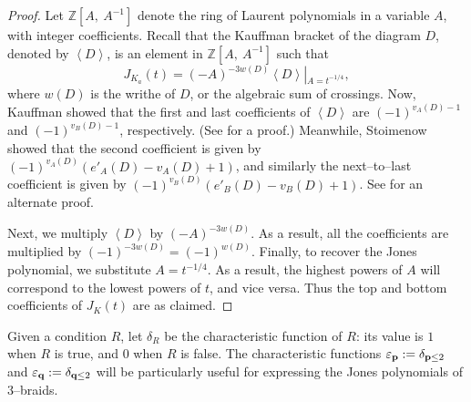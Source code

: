 \documentclass[11pt]{amsart}
\newcommand{\ZZ}{{\mathbb{Z}}}
\newcommand{\p}{{\bf p}}
\newcommand{\q}{{\bf q}}
\newcommand{\ep}{\varepsilon_{\p}}
\newcommand{\eq}{\varepsilon_{\q}}
\theoremstyle{plain}
\theoremstyle{definition}
\begin{document}
\begin{proof}
Let $\ZZ [A,\ A^{-1}]$ denote the ring of Laurent polynomials in a
variable $A$, with integer coefficients.  Recall that the Kauffman
bracket of the diagram $D$, denoted by $\left < D\right >$, is an
element in $\ZZ [A, \ A^{-1}]$ such that
\begin{equation}
  J_{K_a}(t)= (-A)^{-3 w(D)} \left< D\right>
  \left|_{\displaystyle{A=t^{-1/4}}}\right., 
  \label{eqn:Jones-Kauffman}
\end{equation}
where $w(D)$ is the writhe of $D$, or the algebraic sum of crossings.
Now, Kauffman showed that the first and last coefficients of $\left< D
\right>$ are $(-1)^{v_A(D)-1}$ and $(-1)^{v_B(D)-1}$, respectively.
(See \cite[Theorem 6.1]{dasbach-futer2...} for a proof.) Meanwhile,
Stoimenow showed \cite{stoimenow:amphichiral} that the second coefficient is given by
$(-1)^{v_A(D)}(e'_A(D) - v_A(D) + 1)$, and similarly the
next--to--last coefficient is given by $(-1)^{v_B(D)}(e'_B(D) - v_B(D)
+ 1)$.  See \cite[Corollary 6.3]{dasbach-futer2...} for an alternate proof.

Next, we multiply $\left< D \right>$ by $(-A)^{-3w(D)}$. As a result,
all the coefficients are multiplied by $(-1)^{-3w(D)} =
(-1)^{w(D)}$. Finally, to recover the Jones polynomial, we substitute
$A = t^{-1/4}$. As a result, the highest powers of $A$ will correspond
to the lowest powers of $t$, and vice versa. Thus the top and bottom
coefficients of $J_K(t)$ are as claimed.
\end{proof}

Given a condition $R$, let $\delta_R$ be the characteristic function of $R$: its value is $1$ when 
$R$ is true, and $0$ when $R$ is false. The characteristic functions $\ep: = \delta_{\p \leq 2}$ and 
$\eq: = \delta_{\q \leq 2}$ will be particularly useful for expressing the Jones polynomials of $3$--braids.
\end{document}
